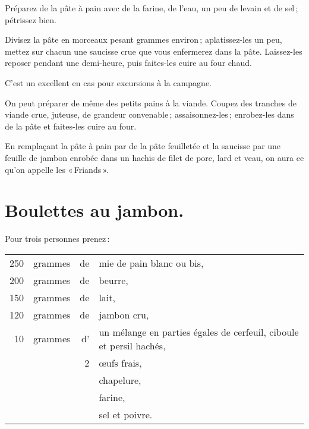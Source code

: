 Préparez de la pâte à pain avec de la farine, de l'eau, un peu de levain et de
sel ; pétrissez bien.

Divisez la pâte en morceaux pesant {\mmm} grammes environ ; aplatissez-les un peu,
mettez sur chacun une saucisse crue que vous enfermerez dans la pâte.
Laissez-les reposer pendant une demi-heure, puis faites-les cuire au four
chaud.

C'est un excellent en cas pour excursions à la campagne.

\sk

On peut préparer de même des petits pains à la viande. Coupez des tranches de
viande crue, juteuse, de grandeur convenable ; assaisonnez-les ; enrobez-les
dans de la pâte et faites-les cuire au four.

\sk

En remplaçant la pâte à pain par de la pâte feuilletée et la saucisse par une
feuille de jambon enrobée dans un hachis de filet de porc, lard et veau, on aura
ce qu'on appelle les « Friands ».

\section*{\centering Boulettes au jambon.}
{}
\label{pg0541} \hypertarget{p0541}{}

Pour trois personnes prenez :

\medskip

\footnotesize
\begin{longtable}{rrrp{16em}}
    250 & grammes & de & mie de pain blanc ou bis,                                                        \\
    200 & grammes & de & beurre,                                                                          \\
    150 & grammes & de & lait,                                                                            \\
    120 & grammes & de & jambon cru,                                                                      \\
     10 & grammes & d' & un mélange en parties égales de cerfeuil, ciboule et persil hachés,              \\
        &         &  2 & œufs frais,                                                                      \\
        &         &    & chapelure,                                                                       \\
        &         &    & farine,                                                                          \\
        &         &    & sel et poivre.                                                                   \\
\end{longtable}
\normalsize

